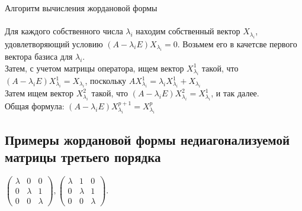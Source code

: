 \documentclass[12pt]{article}
\begin{document}
    Алгоритм вычисления жордановой формы\\\\
    Для каждого собственного числа \(\lambda_i\) находим собственный вектор \(X_{\lambda_i}\), удовлетворяющий условию \((A - \lambda_iE)X_{\lambda_i} = 0\). Возьмем его в качетсве первого вектора базиса для \(\lambda_i\). \\
    Затем, с учетом матрицы оператора, ищем вектор \(X_{\lambda_i}^1\) такой, что \((A - \lambda_iE)X_{\lambda_i}^1 = X_{\lambda_i}\), поскольку \(AX_{\lambda_i}^1 = \lambda_iX_{\lambda_i}^1 + X_{\lambda_i}\)\\
    Затем ищем вектор \(X_{\lambda_i}^2\) такой, что \((A - \lambda_iE)X_{\lambda_i}^2 = X_{\lambda_i}^1\), и так далее.\\
    Общая формула: \((A - \lambda_iE)X_{\lambda_i}^{p+1} = X_{\lambda_i}^p\)\\

    \subsection{Примеры жордановой формы недиагонализуемой матрицы третьего порядка}
$
\begin{pmatrix}
    \lambda & 0       & 0       \\
    0       & \lambda & 1       \\
    0       & 0       & \lambda
\end{pmatrix},
\begin{pmatrix}
    \lambda & 1       & 0       \\
    0       & \lambda & 1       \\
    0       & 0       & \lambda
\end{pmatrix}$.
\end{document}
